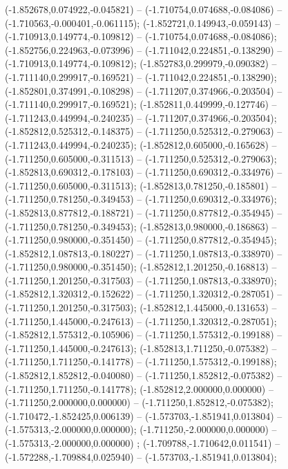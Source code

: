  (-1.852678,0.074922,-0.045821) -- (-1.710754,0.074688,-0.084086) -- (-1.710563,-0.000401,-0.061115);
 (-1.852721,0.149943,-0.059143) -- (-1.710913,0.149774,-0.109812) -- (-1.710754,0.074688,-0.084086);
 (-1.852756,0.224963,-0.073996) -- (-1.711042,0.224851,-0.138290) -- (-1.710913,0.149774,-0.109812);
 (-1.852783,0.299979,-0.090382) -- (-1.711140,0.299917,-0.169521) -- (-1.711042,0.224851,-0.138290);
 (-1.852801,0.374991,-0.108298) -- (-1.711207,0.374966,-0.203504) -- (-1.711140,0.299917,-0.169521);
 (-1.852811,0.449999,-0.127746) -- (-1.711243,0.449994,-0.240235) -- (-1.711207,0.374966,-0.203504);
 (-1.852812,0.525312,-0.148375) -- (-1.711250,0.525312,-0.279063) -- (-1.711243,0.449994,-0.240235);
 (-1.852812,0.605000,-0.165628) -- (-1.711250,0.605000,-0.311513) -- (-1.711250,0.525312,-0.279063);
 (-1.852813,0.690312,-0.178103) -- (-1.711250,0.690312,-0.334976) -- (-1.711250,0.605000,-0.311513);
 (-1.852813,0.781250,-0.185801) -- (-1.711250,0.781250,-0.349453) -- (-1.711250,0.690312,-0.334976);
 (-1.852813,0.877812,-0.188721) -- (-1.711250,0.877812,-0.354945) -- (-1.711250,0.781250,-0.349453);
 (-1.852813,0.980000,-0.186863) -- (-1.711250,0.980000,-0.351450) -- (-1.711250,0.877812,-0.354945);
 (-1.852812,1.087813,-0.180227) -- (-1.711250,1.087813,-0.338970) -- (-1.711250,0.980000,-0.351450);
 (-1.852812,1.201250,-0.168813) -- (-1.711250,1.201250,-0.317503) -- (-1.711250,1.087813,-0.338970);
 (-1.852812,1.320312,-0.152622) -- (-1.711250,1.320312,-0.287051) -- (-1.711250,1.201250,-0.317503);
 (-1.852812,1.445000,-0.131653) -- (-1.711250,1.445000,-0.247613) -- (-1.711250,1.320312,-0.287051);
 (-1.852812,1.575312,-0.105906) -- (-1.711250,1.575312,-0.199188) -- (-1.711250,1.445000,-0.247613);
 (-1.852813,1.711250,-0.075382) -- (-1.711250,1.711250,-0.141778) -- (-1.711250,1.575312,-0.199188);
 (-1.852812,1.852812,-0.040080) -- (-1.711250,1.852812,-0.075382) -- (-1.711250,1.711250,-0.141778);
 (-1.852812,2.000000,0.000000) -- (-1.711250,2.000000,0.000000) -- (-1.711250,1.852812,-0.075382);
 (-1.710472,-1.852425,0.006139) -- (-1.573703,-1.851941,0.013804) -- (-1.575313,-2.000000,0.000000);
 (-1.711250,-2.000000,0.000000) -- (-1.575313,-2.000000,0.000000) ;
 (-1.709788,-1.710642,0.011541) -- (-1.572288,-1.709884,0.025940) -- (-1.573703,-1.851941,0.013804);
